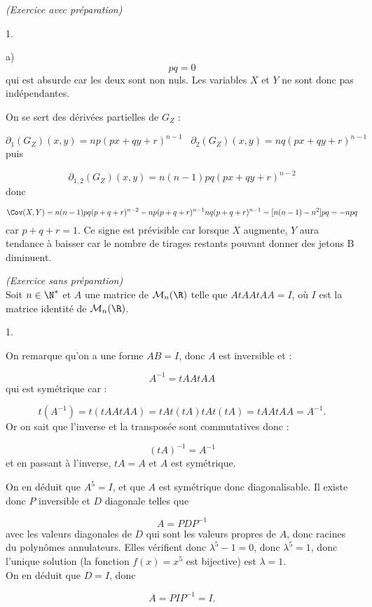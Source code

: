 \documentclass[11pt]{article}%
\begin{document}
\begin{exercice}{\it (Exercice avec préparation)}
\begin{noliste}{1.}
\begin{noliste}{a)}
      \[
      p q = 0 
      \]
      qui est absurde car les deux sont non nuls. Les variables $X$ et $Y$
      ne sont donc pas indépendantes.
      
    \item On se sert des dérivées partielles de $G_{Z}$ : 
      
      \[
      \partial_{1} (G_{Z} ) (x,y) = n p ( px + q y + r)^{n-1} \ \, \
      \ \partial_{2} (G_{Z} ) (x,y) = n q ( px + q y + r )^{ n-1 }
      \]
      puis
      
      \[
      \partial_{1,2} (G_{Z}) (x,y) = n (n-1) p q (px + q y + r )^{ n - 2 } 
      \]
      donc
      
      \[
      \Cov ( X, Y ) = n (n-1) pq (p + q + r)^{n-2} - n p ( p + q + 
      r)^{n-1} n q ( p + q + r)^{n-1} = [ n(n-1) - n^{2} ] p q = - n p
      q
      \]
      car $p + q + r = 1$. Ce signe est prévisible car lorsque $X$ augmente,
      $Y$ aura tendance à baisser car le nombre de tirages restants pouvant
      donner des jetons B diminuent.
    \end{noliste}
  \end{noliste}
\end{exercice}

\addtocounter{exercice}{-1}
\begin{exercice}{\it (Exercice sans préparation)}~\\
 Soit $n \in \N^*$ et $A$ une matrice de $\mathcal{M}_{n} (\R)$ telle
 que $A {}{t} A A {}{t} A A = I$, où $I$ est la matrice identité de
 $\mathcal{M}_{n} (\R)$.
 \begin{noliste}{1.}
 \setlength{\itemsep}{4mm}
 \item On remarque qu'on a une forme $A B = I$, donc $A$ est
 inversible et :
 
\[
 A^{-1} = {}{t}A A {}{t}A A 
\]
 qui est symétrique car : 
 
\[
 {}{t}(A^{-1}) = {}{t}( {}{t}A A {}{t}A A ) = {}{t} A {}{t} ( {}{t} A )
 {}{t} A {}{t} ({}{t} A ) = {}{t} A A {}{t} A A = A^{-1}.
\]
 Or on sait que l'inverse et la transposée sont commutatives donc : 
 
\[
 ( {}{t}A )^{-1} = A^{-1} 
\]
 et en passant à l'inverse, ${}{t}A = A$ et $A$ est symétrique. \\
 
 \item On en déduit que $A^{5} = I$, et que $A$ est symétrique donc
 diagonalisable. Il existe donc $P$ inversible et $D$ diagonale
 telles que
 
\[
 A = P D P^{-1}
\]
 avec les valeurs diagonales de $D$ qui sont les valeurs propres de
 $A$, donc racines du polynômes annulateurs. Elles vérifient donc
 $\lambda^{5} - 1 = 0$, donc $\lambda^{5} = 1$, donc l'unique solution
 (la fonction $f(x) = x^{5}$ est bijective) est $\lambda = 
 1$.\\
 On en déduit que $D = I$, donc
 
\[
 A = P I P^{-1} = I. 
\]
 \end{noliste}
\end{exercice}
\end{document}
